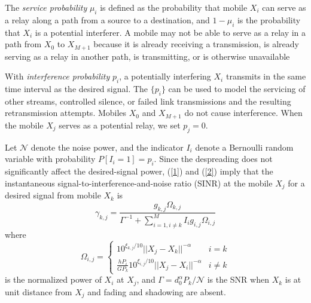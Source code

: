 \documentclass[conference]{IEEEtran}
\begin{document}
The \emph{service probability} $\mu_{i}$ is defined as the probability that
mobile $X_{i}$ can serve as a relay along a path from a source to a
destination, and $1-\mu_{i}$ is the probability that $X_{i}$ is a potential
interferer.  A mobile may not be able to
serve as a relay in a path from $X_{0}$ to $X_{M+1}$
because it
is already receiving a transmission, is already serving as
a relay in another path, is transmitting, or is otherwise
unavailable


With \emph{interference probability} $p_{i}$, a potentially interfering $X_{i}$
transmits in the same time interval as the desired signal. The $\{p_{i}\}$ can
be used to model the servicing of other streams, controlled silence, or failed
link transmissions and the resulting retransmission attempts. Mobiles $X_{0}$
and $X_{M+1}$ do not cause interference. When the mobile $X_{j}$ serves as a
potential relay, we set $p_{j}=0.$

Let $\mathcal{N}$ denote the noise power, and the indicator $I_{i}$ denote a
Bernoulli random variable with probability $P[I_{i}=1]=p_{i}$. Since the
despreading does not significantly affect the desired-signal power, (\ref{1})
and (\ref{2}) imply that the instantaneous signal-to-interference-and-noise
ratio (SINR) at the mobile $X_{j}$ for a desired signal from mobile
$X_{k}$ is
\begin{equation}
\gamma_{k,j}=\frac{g_{k,j}\Omega_{k,j}}{\displaystyle\Gamma^{-1}+\sum_{i=1,i\neq
k}^{M}I_{i}g_{i,j}\Omega_{i,j}}\end{equation}
where
\begin{equation}
\Omega_{i,j}=\begin{cases}
10^{\xi_{k,j}/10}||X_{j}-X_{k}||^{-\alpha} & i=k\\
\displaystyle\frac{h{P}_{i}}{GP_{k}}10^{\xi_{i,j}/10}||X_{j}-X_{i}||^{-\alpha}
& i\neq k
\end{cases}
\end{equation}
is the normalized power of $X_{i}$ at $X_{j}$, and $\Gamma=d_{0}^{\alpha}P_{k}/\mathcal{N}$ is the SNR when $X_{k}$ is at unit distance from $X_{j}$
and fading and shadowing are absent.
\end{document}
